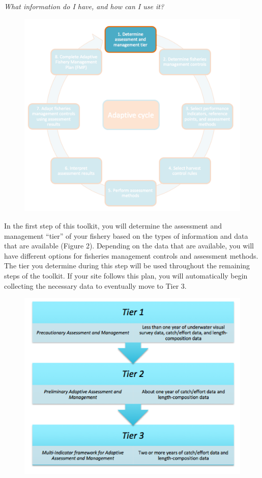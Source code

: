 \documentclass[]{book}
\begin{document}
\emph{What information do I have, and how can I use it?}

\begin{figure}
\centering
\includegraphics{myMediaFolder/media/Step1.png}
\caption{}
\end{figure}

In the first step of this toolkit, you will determine the assessment and
management ``tier'' of your fishery based on the types of information
and data that are available (Figure 2). Depending on the data that are
available, you will have different options for fisheries management
controls and assessment methods. The tier you determine during this step
will be used throughout the remaining steps of the toolkit. If your site
follows this plan, you will automatically begin collecting the necessary
data to eventually move to Tier 3.

\begin{figure}
\centering
\includegraphics{myMediaFolder/media/Tiers.png}
\caption{}
\end{figure}
\end{document}
